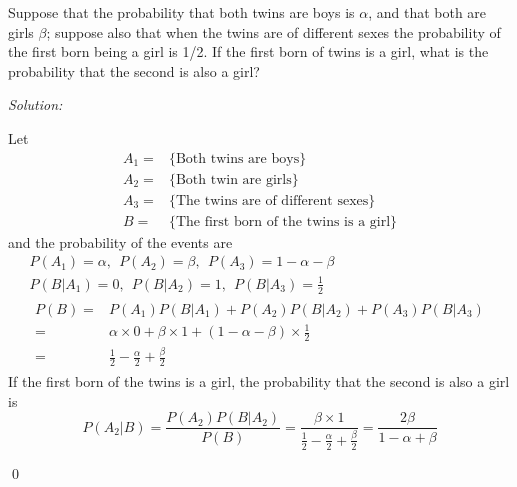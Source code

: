 \documentclass[12pt]{article}
\newenvironment{problem}[2][Problem]{\begin{trivlist}
\item[\hskip \labelsep {\bfseries #1}\hskip \labelsep {\bfseries #2.}]}{\end{trivlist}}
\newenvironment{sol}
    {\emph{Solution:}
    }
    {
    \qed
    }
\begin{document}
\begin{problem}{2}
Suppose that the probability that both twins are boys is $\alpha$, and that
both are girls $\beta$; suppose also that when the twins are of different sexes
the probability of the first born being a girl is 1/2. If the first born of
twins is a girl, what is the probability that the second is also a girl?
\end{problem}
\begin{sol}
Let
\begin{align*}
A_1=&\{\text{Both twins are boys}\}\\
A_2=&\{\text{Both twin are girls}\}\\
A_3=&\{\text{The twins are of different sexes}\}\\
B=&\{\text{The first born of the twins is a girl}\}
\end{align*}
and the probability of the events are
\begin{gather*}
P(A_1)=\alpha,~~P(A_2)=\beta,~~P(A_3)=1-\alpha-\beta\\
P(B|A_1)=0,~~P(B|A_2)=1,~~P(B|A_3)=\frac{1}{2}\\
\begin{align*}
P(B)=&P(A_1)P(B|A_1)+P(A_2)P(B|A_2)+P(A_3)P(B|A_3)\\
=&\alpha\times0+\beta\times1+(1-\alpha-\beta)\times\frac{1}{2}\\
=&\frac{1}{2}-\frac{\alpha}{2}+\frac{\beta}{2}
\end{align*}
\end{gather*}
If the first born of the twins is a girl, the probability that the second is also a girl is
\[
P(A_2|B)=\frac{P(A_2)P(B|A_2)}{P(B)}=\frac{\beta\times1}{\frac{1}{2}-\frac{\alpha}{2}+\frac{\beta}{2}}=\frac{2\beta}{1-\alpha+\beta}
\]
\end{sol}
\end{document}
